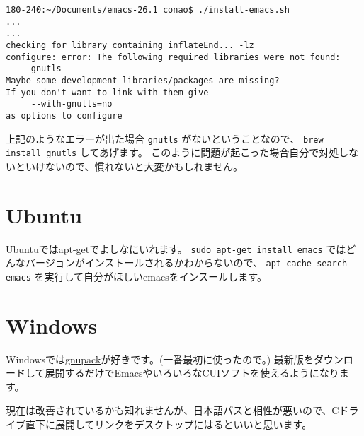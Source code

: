 \documentclass[11pt]{article}
\begin{document}
\begin{itemize}
\begin{verbatim}
180-240:~/Documents/emacs-26.1 conao$ ./install-emacs.sh 
...
...
checking for library containing inflateEnd... -lz
configure: error: The following required libraries were not found:
     gnutls
Maybe some development libraries/packages are missing?
If you don't want to link with them give
     --with-gnutls=no
as options to configure
\end{verbatim}

上記のようなエラーが出た場合 \texttt{gnutls} がないということなので、 \texttt{brew install gnutls} してあげます。
このように問題が起こった場合自分で対処しないといけないので、慣れないと大変かもしれません。
\end{itemize}
\section{Ubuntu}
\label{sec:orgc1e5157}
Ubuntuではapt-getでよしなにいれます。 \texttt{sudo apt-get install emacs} ではどんなバージョンがインストールされるかわからないので、
\texttt{apt-cache search emacs} を実行して自分がほしいemacsをインスールします。
\section{Windows}
\label{sec:org66e04b0}
Windowsでは\href{https://ja.osdn.net/projects/gnupack/}{gnupack}が好きです。(一番最初に使ったので。)
最新版をダウンロードして展開するだけでEmacsやいろいろなCUIソフトを使えるようになります。

現在は改善されているかも知れませんが、日本語パスと相性が悪いので、Cドライブ直下に展開してリンクをデスクトップにはるといいと思います。
\end{document}

